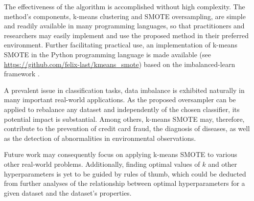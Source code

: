 \documentclass[sort&compress]{elsarticle}
\begin{document}
The effectiveness of the algorithm is accomplished without high complexity. The method's components, k-means clustering and \ac{SMOTE} oversampling, are simple and readily available in many programming languages, so that practitioners and researchers may easily implement and use the proposed method in their preferred environment. Further facilitating practical use, an implementation of k-means \ac{SMOTE} in the Python programming language is made available (see \url{https://github.com/felix-last/kmeans_smote}) based on the imbalanced-learn framework \citep{Lemaitre.2017}.

A prevalent issue in classification tasks, data imbalance is exhibited naturally in many important real-world applications. As the proposed oversampler can be applied to rebalance any dataset and independently of the chosen classifier, its potential impact is substantial. Among others, k-means \ac{SMOTE} may, therefore, contribute to the prevention of credit card fraud, the diagnosis of diseases, as well as the detection of abnormalities in environmental observations.

Future work may consequently focus on applying k-means \ac{SMOTE} to various other real-world problems. Additionally, finding optimal values of $k$ and other hyperparameters is yet to be guided by rules of thumb, which could be deducted from further analyses of the relationship between optimal hyperparameters for a given dataset and the dataset's properties.



\end{document}
